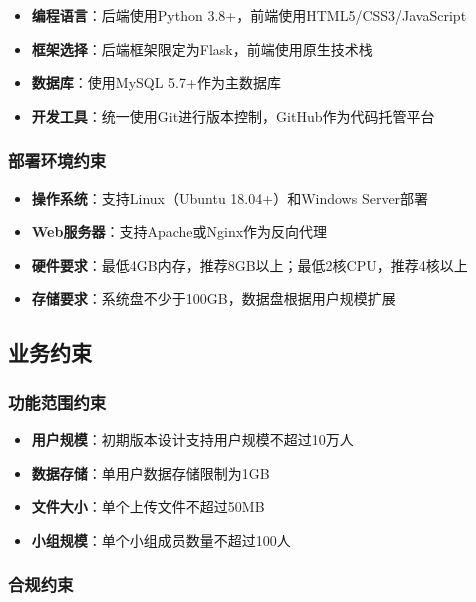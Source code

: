 \documentclass[a4paper]{article}
\begin{document}
\begin{itemize}
    \item \textbf{编程语言}：后端使用Python 3.8+，前端使用HTML5/CSS3/JavaScript
    \item \textbf{框架选择}：后端框架限定为Flask，前端使用原生技术栈
    \item \textbf{数据库}：使用MySQL 5.7+作为主数据库
    \item \textbf{开发工具}：统一使用Git进行版本控制，GitHub作为代码托管平台
\end{itemize}

\subsubsection{部署环境约束}

\begin{itemize}
    \item \textbf{操作系统}：支持Linux（Ubuntu 18.04+）和Windows Server部署
    \item \textbf{Web服务器}：支持Apache或Nginx作为反向代理
    \item \textbf{硬件要求}：最低4GB内存，推荐8GB以上；最低2核CPU，推荐4核以上
    \item \textbf{存储要求}：系统盘不少于100GB，数据盘根据用户规模扩展
\end{itemize}

\subsection{业务约束}

\subsubsection{功能范围约束}

\begin{itemize}
    \item \textbf{用户规模}：初期版本设计支持用户规模不超过10万人
    \item \textbf{数据存储}：单用户数据存储限制为1GB
    \item \textbf{文件大小}：单个上传文件不超过50MB
    \item \textbf{小组规模}：单个小组成员数量不超过100人
\end{itemize}

\subsubsection{合规约束}
\end{document}
